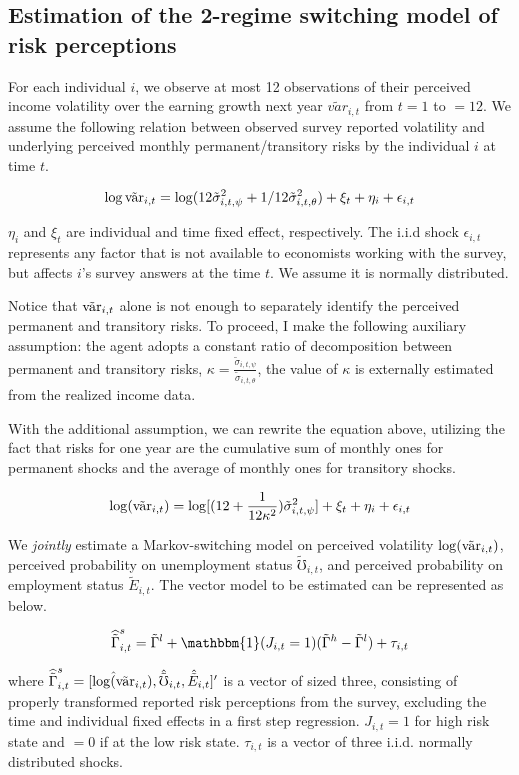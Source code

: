 \subsection{Estimation of the 2-regime switching model of risk perceptions}
\label{appendix:markov}

For each individual $i$, we observe at most 12 observations of their perceived income volatility over the earning growth next year $\tilde {var}_{i,t}$ from $t=1$ to $=12$. We assume the following relation between observed survey reported volatility and underlying perceived monthly permanent/transitory risks by the individual $i$ at time $t$.  


$$\log \tilde {\text{var}}_{i,t}= \log(12 \tilde \sigma^2_{i,t,\psi} + 1/12 \tilde \sigma^2_{i,t,\theta})+\xi_{t}+\eta_{i}+\epsilon_{i,t}$$

$\eta_i$ and $\xi_t$ are individual and time fixed effect, respectively. The i.i.d shock $\epsilon_{i,t}$ represents any factor that is not available to economists working with the survey, but affects $i$'s survey answers at the time $t$. We assume it is normally distributed.

Notice that $\tilde {\text{var}}_{i,t}$ alone is not enough to separately identify the perceived permanent and transitory risks. To proceed, I make the following auxiliary assumption: the agent adopts a constant ratio of decomposition between permanent and transitory risks, $\kappa =\frac{\tilde \sigma_{i,t,\psi}}{\tilde \sigma_{i,t,\theta}}$, the value of $\kappa$ is externally estimated from the realized income data. 

With the additional assumption, we can rewrite the equation above, utilizing the fact that risks for one year are the cumulative sum of monthly ones for permanent shocks and the average of monthly ones for transitory shocks.

$$\log(\tilde {\text{var}}_{i,t})= \log[(12+\frac{1}{12\kappa^2})\tilde \sigma^2_{i,t,\psi}] + \xi_{t}+\eta_{i}+ \epsilon_{i,t}$$

We \textit{jointly} estimate a Markov-switching model on perceived volatility $\log(\tilde {\text{var}}_{i,t})$, perceived probability on unemployment status $\tilde \mho_{i,t}$, and perceived probability on employment status $\tilde E_{i,t}$. The vector model to be estimated can be represented as below.

$$\widehat{\tilde{\Gamma}}^s_{i,t} = \tilde \Gamma^l + \mathbbm{1}(J_{i,t}=1)(\tilde \Gamma^h-\tilde \Gamma^l) +\tau_{i,t}$$

where $\widehat{\tilde{\Gamma}}^s_{i,t}= [\hat{\log(\tilde{\text{var}}}_{i,t}),\hat{\tilde \mho}_{i,t},\hat{\tilde E}_{i,t}]'$ is a vector of sized three, consisting of properly transformed reported risk perceptions from the survey, excluding the time and individual fixed effects in a first step regression. $J_{i,t}=1$ for high risk state and $=0$ if at the low risk state. $\tau_{i,t}$ is a vector of three i.i.d. normally distributed shocks.

